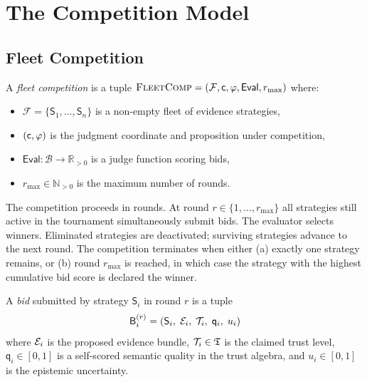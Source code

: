 \documentclass[11pt]{article}
\providecommand{\Fleet}{\mathcal{F}}              %
\providecommand{\Strat}{\mathsf{S}}               %
\providecommand{\Bid}{\mathsf{B}}                 %
\providecommand{\Eval}{\mathsf{Eval}}             %
\providecommand{\tqual}{\mathsf{q}}               %
\providecommand{\BidSet}{\mathcal{B}}             %
\providecommand{\FleetComp}{\textsc{FleetComp}}   %
\begin{document}
\section{The Competition Model}\label{sec:model}

\subsection{Fleet Competition}

\begin{definition}[\FleetComp{}]\label{def:fleetcomp}
A \emph{fleet competition} is a tuple $\FleetComp = (\Fleet, \coord, \prop,
\Eval, r_{\max})$ where:
\begin{itemize}
  \item $\Fleet = \{\Strat_1, \ldots, \Strat_n\}$ is a non-empty fleet of
    evidence strategies,
  \item $(\mathsf{c}, \varphi)$ is the judgment coordinate and proposition under
    competition,
  \item $\Eval : \BidSet \to \mathbb{R}_{>0}$ is a judge function scoring bids,
  \item $r_{\max} \in \mathbb{N}_{>0}$ is the maximum number of rounds.
\end{itemize}
\end{definition}

The competition proceeds in rounds.  At round $r \in \{1, \ldots, r_{\max}\}$
all strategies still active in the tournament simultaneously submit bids.  The
evaluator selects winners.  Eliminated strategies are deactivated; surviving
strategies advance to the next round.  The competition terminates when either
(a) exactly one strategy remains, or (b) round $r_{\max}$ is reached, in which
case the strategy with the highest cumulative bid score is declared the winner.

\begin{definition}[Bid]\label{def:bid}
A \emph{bid} submitted by strategy $\Strat_i$ in round $r$ is a tuple
\[
  \Bid_i^{(r)} = (\Strat_i,\; \evid_i,\; \trust_i,\; \tqual_i,\; u_i)
\]
where $\mathcal{E}_i$ is the proposed evidence bundle, $\mathcal{T}_i \in \mathfrak{T}$ is the
claimed trust level, $\tqual_i \in [0,1]$ is a self-scored semantic quality
in the trust algebra, and $u_i \in [0,1]$ is the epistemic uncertainty.
\end{definition}
\end{document}
